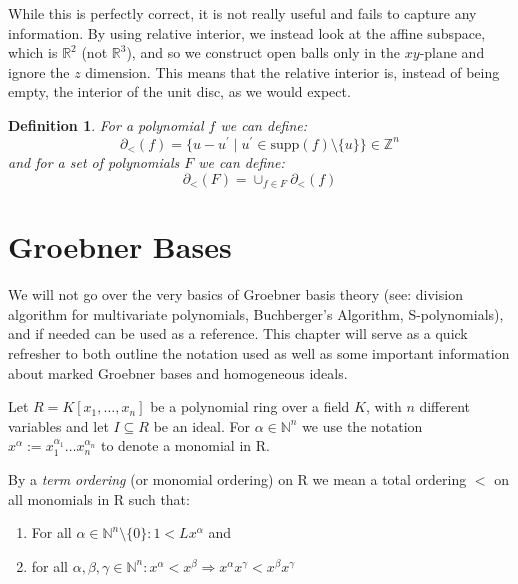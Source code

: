 \documentclass[12pt,a4paper]{report}
\newtheorem{definition}{Definition}
\begin{document}
While this is perfectly correct, it is not really useful and fails to capture any information. By using relative interior, we instead look at the affine subspace, which is $\mathbb{R}^{2}$ (not $\mathbb{R}^{3}$), and so we construct open balls only in the $xy$-plane and ignore the $z$ dimension. This means that the relative interior is, instead of being empty, the interior of the unit disc, as we would expect.  

\begin{definition}
For a polynomial $f$ we can define:
\begin{equation*}
    \partial_{<} (f) = \{ u - u^{'} \mid u^{'} \in \text{supp}(f) \setminus \{u \} \} \in \mathbb Z^{n}
\end{equation*}
and for a set of polynomials $F$ we can define:
\begin{equation*}
    \partial_{<} (F) = \cup_{f \in F} \partial_{<} (f)
\end{equation*}
\end{definition}

\section{Groebner Bases}
We will not go over the very basics of Groebner basis theory (see: division algorithm for multivariate polynomials, Buchberger's Algorithm, S-polynomials), and if needed \cite{StandardGroebner} can be used as a reference. This chapter will serve as a quick refresher to both outline the notation used as well as some important information about marked Groebner bases and homogeneous ideals. 

Let $R = K[x_{1}, \ldots, x_{n}]$ be a polynomial ring over a field $K$, with $n$ different variables and let $I \subseteq R$ be an ideal. For $\alpha \in \mathbb N^{n}$ we use the notation $x^{\alpha} := x_{1} ^{\alpha_{1}} \ldots x_{n} ^{\alpha_{n}}$ to denote a monomial in R. 

By a \emph{term ordering} (or monomial ordering) on R we mean a total ordering  $<$ on all monomials in R such that:

\begin{enumerate}
    \item For all $\alpha \in \mathbb {N}^{n} \setminus \{0\} : 1 < L x^{\alpha}$ and
    \item for all $\alpha, \beta, \gamma \in \mathbb N^{n} : x^{\alpha} < x^{\beta} \Rightarrow x^{\alpha} x^{\gamma} < x^{\beta} x^{\gamma}$
\end{enumerate}
\end{document}
